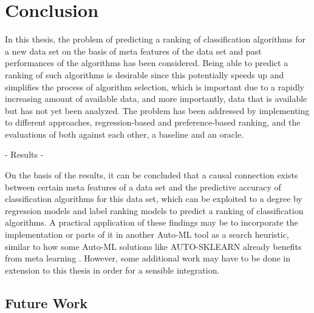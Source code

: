 \chapter{Conclusion}
\label{sec:conclusion}
In this thesis, the problem of predicting a ranking of classification algorithms for a new data set on the basis of meta features of the data set and past performances of the algorithms has been considered. Being able to predict a ranking of such algorithms is desirable since this potentially speeds up and simplifies the process of algorithm selection, which is important due to a rapidly increasing amount of available data, and more importantly, data that is available but has not yet been analyzed. The problem has been addressed by implementing to different approaches, regression-based and preference-based ranking, and the evaluations of both against each other, a baseline and an oracle.

- Results - 

On the basis of the results, it can be concluded that a causal connection exists between certain meta features of a data set and the predictive accuracy of classification algorithms for this data set, which can be exploited to a degree by regression models and label ranking models to predict a ranking of classification algorithms. A practical application of these findings may be to incorporate the implementation or parts of it in another Auto-ML tool as a search heuristic, similar to how some Auto-ML solutions like AUTO-SKLEARN already benefits from meta learning \cite{feurer2015efficient}. However, some additional work may have to be done in extension to this thesis in order for a sensible integration.

\section{Future Work}
\label{sec:conclusion:future}






